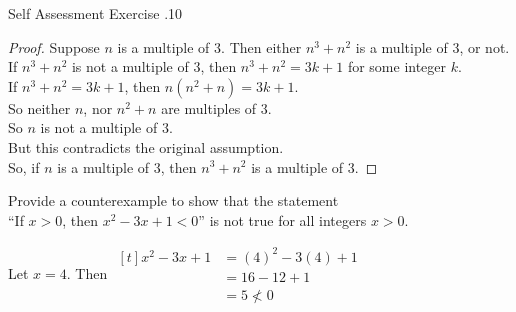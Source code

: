\documentclass[\main/notes.tex]{subfiles}
\begin{document}
\begin{exercise}{Self Assessment Exercise \thechapter.10}
\begin{questions}
\begin{questions}
\begin{answer}
\begin{proof}
											Suppose $n$ is a multiple of $3$. Then either $n^{3} + n^{2}$ is a multiple of $3$, or not.\\
											If $n^{3} + n^{2}$ is not a multiple of $3$, then $n^{3} + n^{2} = 3k + 1$ for some integer $k$.\\
											If $n^{3} + n^{2} = 3k + 1$, then $n(n^{2} + n) = 3k + 1$.\\
											So neither $n$, nor $n^{2} + n$ are multiples of $3$.\\
											So $n$ is not a multiple of $3$.\\
											But this contradicts the original assumption.\\
											So, if $n$ is a multiple of $3$, then $n^{3} + n^{2}$ is a multiple of $3$.
										\end{proof}
									\end{answer}
							\end{questions}
						\item Provide a counterexample to show that the statement \\ ``If $x > 0$, then $x^{2} - 3x + 1 < 0$'' is not true for all integers $x > 0$.\\
							\begin{answer}
								Let $x = 4$. Then $ \begin{aligned}[t]
									x^{2} - 3x + 1 &= (4)^{2} - 3(4) + 1\\
									&= 16 - 12 + 1\\
									&= 5 \not < 0
								\end{aligned}$
							\end{answer}
					\end{questions}
				\end{exercise}
				\vspace*{\parskip}
\end{document}
